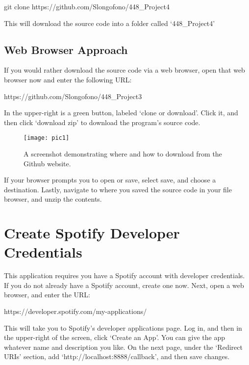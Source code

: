 \documentclass{roffin}
\begin{document}
\hspace{1cm} git clone https://github.com/Slongofono/448\_Project4

\hfill
\newline
This will download the source code into a folder called `448\_Project4' 

\subsection{Web Browser Approach}
If you would rather download the source code via a web browser, open that web browser now and enter the following URL: 
\newline

\hspace{1cm} https://github.com/Slongofono/448\_Project3

\hfill
\newline
In the upper-right is a green button, labeled `clone or download'. Click it, and then click `download zip' to download the program’s source code.

\begin{figure}[!h]
    \centering
    \texttt{[image: pic1]}
    \caption{A screenshot demonstrating where and how to download from the Github website.}
    \label{fig:fig1}
\end{figure}

If your browser prompts you to open or save, select save, and choose a destination. Lastly, navigate to where you saved the source code in your file browser, and unzip the contents.

\section{Create Spotify Developer Credentials}

This application requires you have a Spotify account with developer credentials. If you do not already have a Spotify account, create one now. Next, open a web browser, and enter the URL:  
\newline

\hspace{1cm} https://developer.spotify.com/my-applications/

\hfill
\newline
This will take you to Spotify's developer applications page. Log in, and then in the upper-right of the screen, click `Create an App'. You can give the app whatever name and description you like. On the next page, under the `Redirect URIs' section, add `http://localhost:8888/callback', and then save changes.
\end{document}
